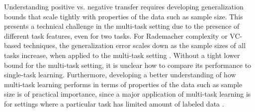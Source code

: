 Understanding positive vs. negative transfer requires developing generalization bounds that scale tightly with properties of the data such as sample size.
This presents a technical challenge in the multi-task setting due to the presence of different task features, even for two tasks.
For Rademacher complexity or VC-based techniques, the generalization error scales down as the sample sizes of all tasks increase, when applied to the multi-task setting \cite{B00,AZ05,M06,MPR16,WZR20}.
Without a tight lower bound for the multi-task setting, it is unclear how to compare its performance to single-task learning.
Furthermore, developing a better understanding of how multi-task learning performs in terms of properties of the data such as sample size is of practical importance, since a major application of multi-task learning is for settings where a particular task has limited amount of labeled data \cite{RH19}.


